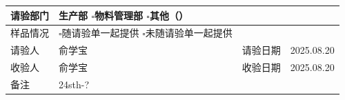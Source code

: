 \documentclass[UTF8,10pt,a4paper,fontset=fandol]{ctexart}
\newcommand{\fieldvalue}[1]{#1}
\newcommand{\handwritten}[1]{#1}
\begin{document}
\begin{tabularx}{\textwidth}{|>{\centering\arraybackslash}p{2.2cm}|X|>{\centering\arraybackslash}p{2.2cm}|X|}
请验部门 &
\fieldvalue{\handwritten{\checkmark}}生产部
\quad $\square$物料管理部
\quad $\square$其他（\hspace{2cm}）
&
\multicolumn{2}{l|}{}
\\ \hline

样品情况 &
$\square$随请验单一起提供
\quad $\square$未随请验单一起提供
&
\multicolumn{2}{l|}{}
\\ \hline

请验人 &
\fieldvalue{\handwritten{俞学宝}}
&
请验日期 &
\fieldvalue{\handwritten{2025.08.20}}
\\ \hline

收验人 &
\fieldvalue{\handwritten{俞学宝}}
&
收验日期 &
\fieldvalue{\handwritten{2025.08.20}}
\\ \hline

备注 &
\fieldvalue{\handwritten{24sth\quad 8-?}} &
\multicolumn{2}{l|}{}
\\ \hline
\end{tabularx}


\newpage
\end{document}
